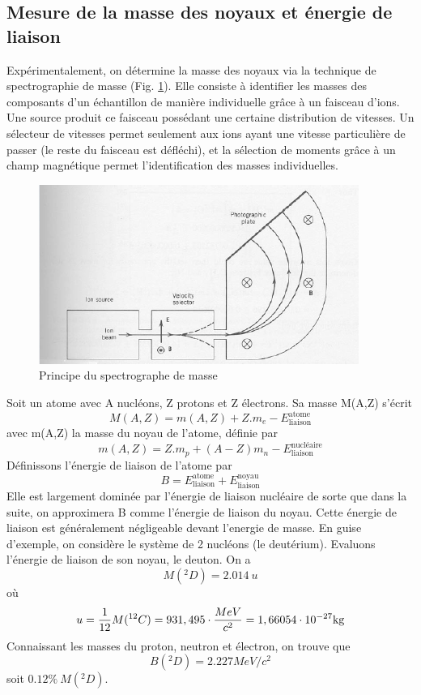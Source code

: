 \subsection{Mesure de la masse des noyaux et énergie de liaison}

Expérimentalement, on détermine la masse des noyaux via la technique de spectrographie de masse (Fig. \ref{fig:spectro_masse}). Elle consiste à identifier les masses des composants d'un échantillon de manière individuelle grâce à un faisceau d'ions. Une source produit ce faisceau possédant une certaine distribution de vitesses. Un sélecteur de vitesses permet seulement aux ions ayant une vitesse particulière de passer (le reste du faisceau est défléchi), et la sélection de moments grâce à un champ magnétique permet l'identification des masses individuelles.
\begin{figure}[ht]
    \centering
    \includegraphics[scale=0.80]{Images1/spectro.PNG}
    \caption{Principe du spectrographe de masse}
    \label{fig:spectro_masse}
\end{figure}
Soit un atome avec A nucléons, Z protons et Z électrons. Sa masse M(A,Z) s'écrit
\[
    M(A,Z) = m(A,Z) + Z.m_e - E^{\text{atome}}_{\text{liaison}}
\]
avec m(A,Z) la masse du noyau de l'atome, définie par
\[
m(A,Z)=Z.m_p+(A-Z)m_n-E^{\text{nucléaire}}_{\text{liaison}}
\]
Définissons l'énergie de liaison de l'atome par
\[
    B=E^\text{atome}_\text{liaison}+E^{\text{noyau}}_{\text{liaison}}
\]
Elle est largement dominée par l'énergie de liaison nucléaire de sorte que dans la suite, on approximera B comme l'énergie de liaison du noyau. Cette énergie de liaison est généralement négligeable devant l'energie de masse.
En guise d'exemple, on considère le système de 2 nucléons (le deutérium). Evaluons l'énergie de liaison de son noyau, le deuton. On a
\[
    M(^{2}_{}D)=2.014~u
\]
où \[u=\dfrac{1}{12}M(^{12}_{}C)=931,495\cdot\dfrac{MeV}{c^2}=1,66054 \cdot 10^{-27}\kg\]
Connaissant les masses du proton, neutron et électron, on trouve que
\[
    B(^{2}_{}D) = 2.227MeV/c^2
\]
soit $0.12\%~M(^{2}_{}D)$.

